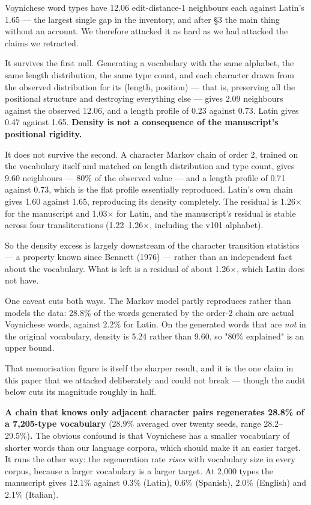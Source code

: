 \documentclass[11pt,a4paper]{article}
\begin{document}
Voynichese word types have 12.06 edit-distance-1 neighbours each against Latin's 1.65 --- the largest single gap in the inventory, and after \S3 the main thing without an account. We therefore attacked it as hard as we had attacked the claims we retracted.


It survives the first null. Generating a vocabulary with the same alphabet, the same length distribution, the same type count, and each character drawn from the observed distribution for its (length, position) --- that is, preserving all the positional structure and destroying everything else --- gives 2.09 neighbours against the observed 12.06, and a length profile of 0.23 against 0.73. Latin gives 0.47 against 1.65. \textbf{Density is not a consequence of the manuscript's positional rigidity.}


It does not survive the second. A character Markov chain of order 2, trained on the vocabulary itself and matched on length distribution and type count, gives 9.60 neighbours --- 80\% of the observed value --- and a length profile of 0.71 against 0.73, which is the flat profile essentially reproduced. Latin's own chain gives 1.60 against 1.65, reproducing its density completely. The residual is 1.26$\times$ for the manuscript and 1.03$\times$ for Latin, and the manuscript's residual is stable across four transliterations (1.22--1.26$\times$, including the v101 alphabet).


So the density excess is largely downstream of the character transition statistics --- a property known since Bennett (1976) --- rather than an independent fact about the vocabulary. What is left is a residual of about 1.26$\times$, which Latin does not have.


One caveat cuts both ways. The Markov model partly reproduces rather than models the data: 28.8\% of the words generated by the order-2 chain are actual Voynichese words, against 2.2\% for Latin. On the generated words that are \emph{not} in the original vocabulary, density is 5.24 rather than 9.60, so "80\% explained" is an upper bound.


That memorisation figure is itself the sharper result, and it is the one claim in this paper that we attacked deliberately and could not break --- though the audit below cuts its magnitude roughly in half.


\textbf{A chain that knows only adjacent character pairs regenerates 28.8\% of a 7,205-type vocabulary} (28.9\% averaged over twenty seeds, range 28.2--29.5\%)\textbf{.} The obvious confound is that Voynichese has a smaller vocabulary of shorter words than our language corpora, which should make it an easier target. It runs the other way: the regeneration rate \emph{rises} with vocabulary size in every corpus, because a larger vocabulary is a larger target. At 2,000 types the manuscript gives 12.1\% against 0.3\% (Latin), 0.6\% (Spanish), 2.0\% (English) and 2.1\% (Italian).
\end{document}
